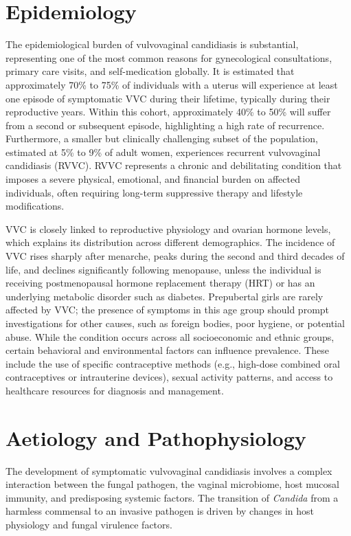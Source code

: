 \section*{Epidemiology}
The epidemiological burden of vulvovaginal candidiasis is substantial, representing one of the most common reasons for gynecological consultations, primary care visits, and self-medication globally. It is estimated that approximately 70\% to 75\% of individuals with a uterus will experience at least one episode of symptomatic VVC during their lifetime, typically during their reproductive years. Within this cohort, approximately 40\% to 50\% will suffer from a second or subsequent episode, highlighting a high rate of recurrence. Furthermore, a smaller but clinically challenging subset of the population, estimated at 5\% to 9\% of adult women, experiences recurrent vulvovaginal candidiasis (RVVC). RVVC represents a chronic and debilitating condition that imposes a severe physical, emotional, and financial burden on affected individuals, often requiring long-term suppressive therapy and lifestyle modifications.

VVC is closely linked to reproductive physiology and ovarian hormone levels, which explains its distribution across different demographics. The incidence of VVC rises sharply after menarche, peaks during the second and third decades of life, and declines significantly following menopause, unless the individual is receiving postmenopausal hormone replacement therapy (HRT) or has an underlying metabolic disorder such as diabetes. Prepubertal girls are rarely affected by VVC; the presence of symptoms in this age group should prompt investigations for other causes, such as foreign bodies, poor hygiene, or potential abuse. While the condition occurs across all socioeconomic and ethnic groups, certain behavioral and environmental factors can influence prevalence. These include the use of specific contraceptive methods (e.g., high-dose combined oral contraceptives or intrauterine devices), sexual activity patterns, and access to healthcare resources for diagnosis and management.

\section*{Aetiology and Pathophysiology}
The development of symptomatic vulvovaginal candidiasis involves a complex interaction between the fungal pathogen, the vaginal microbiome, host mucosal immunity, and predisposing systemic factors. The transition of \textit{Candida} from a harmless commensal to an invasive pathogen is driven by changes in host physiology and fungal virulence factors.


